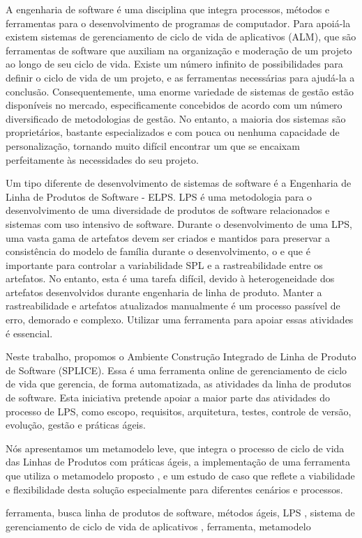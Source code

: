 
A engenharia de software é uma disciplina que integra processos, métodos e ferramentas para o desenvolvimento de programas de computador. Para apoiá-la existem sistemas de gerenciamento de ciclo de vida de aplicativos (ALM), que são ferramentas de software que auxiliam na organização e moderação de um projeto ao longo de seu ciclo de vida. Existe um número infinito de possibilidades para definir o ciclo de vida de um projeto, e as ferramentas necessárias para ajudá-la a conclusão. Consequentemente, uma enorme variedade de sistemas de gestão estão disponíveis no mercado, especificamente concebidos de acordo com um número diversificado de metodologias de gestão. No entanto, a maioria dos sistemas são proprietários, bastante especializados e com pouca ou nenhuma capacidade de personalização, tornando muito difícil encontrar um que se encaixam perfeitamente às necessidades do seu projeto.

Um tipo diferente de desenvolvimento de sistemas de software é a Engenharia de Linha de Produtos de Software - ELPS. LPS é uma metodologia para o desenvolvimento de uma diversidade de produtos de software relacionados e sistemas com uso intensivo de software. Durante o desenvolvimento de uma LPS, uma vasta gama de artefatos devem ser criados e mantidos para preservar a consistência do modelo de família durante o desenvolvimento, o e que é importante para controlar a variabilidade SPL e a rastreabilidade entre os artefatos. No entanto, esta é uma tarefa difícil, devido à heterogeneidade dos artefatos desenvolvidos durante engenharia de linha de produto. Manter a rastreabilidade e artefatos atualizados manualmente é um processo passível de erro, demorado e complexo. Utilizar uma ferramenta para apoiar essas atividades é essencial.

Neste trabalho, propomos o Ambiente Construção Integrado de Linha de Produto de Software (SPLICE). Essa é uma ferramenta online de gerenciamento de ciclo de vida que gerencia, de forma automatizada, as atividades da linha de produtos de software. Esta iniciativa pretende apoiar a maior parte das atividades do processo de LPS, como escopo, requisitos, arquitetura, testes, controle de versão, evolução, gestão e práticas ágeis. 

Nós apresentamos um metamodelo leve, que integra o processo de ciclo de vida das Linhas de Produtos com práticas ágeis, a implementação de uma ferramenta que utiliza o metamodelo proposto , e um estudo de caso que reflete a viabilidade e flexibilidade desta solução especialmente para diferentes cenários e processos.


\begin{keywords}
ferramenta, busca
linha de produtos de software, métodos ágeis, LPS , sistema de gerenciamento de ciclo de vida de aplicativos  , ferramenta, metamodelo

\end{keywords}
